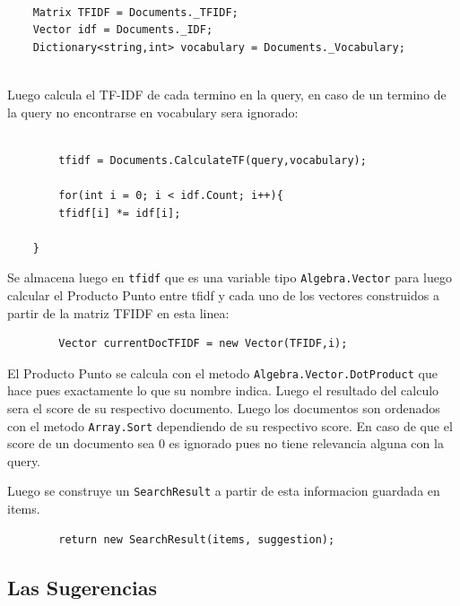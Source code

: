 \documentclass[10pt,a4paper]{report}
\begin{document}
\begin{flushleft}
    \begin{verbatim}
        
    Matrix TFIDF = Documents._TFIDF;
    Vector idf = Documents._IDF;
    Dictionary<string,int> vocabulary = Documents._Vocabulary;
    
    \end{verbatim}

    Luego calcula el TF-IDF de cada termino en la query, en caso de un termino de la query no encontrarse en vocabulary sera ignorado:

    \begin{verbatim}
        
        tfidf = Documents.CalculateTF(query,vocabulary);

        for(int i = 0; i < idf.Count; i++){
        tfidf[i] *= idf[i];
    
    }

    \end{verbatim}

    Se almacena luego en \texttt{tfidf} que es una variable tipo \texttt{Algebra.Vector} para luego calcular el Producto Punto entre tfidf y  cada uno de los vectores construidos a partir de la matriz TFIDF en esta linea:

    \begin{verbatim}
        Vector currentDocTFIDF = new Vector(TFIDF,i);
    \end{verbatim}

    El Producto Punto se calcula con el metodo \texttt{Algebra.Vector.DotProduct} que hace pues exactamente lo que su nombre indica. Luego el resultado del calculo sera el score de su respectivo documento. Luego los documentos son ordenados con el metodo \texttt{Array.Sort} dependiendo de su respectivo score. En caso de que el score de un documento sea 0 es ignorado pues no tiene relevancia alguna con la query.

    Luego se construye un \texttt{SearchResult} a partir de esta informacion guardada en items.
    
    \begin{verbatim}
        return new SearchResult(items, suggestion);
    \end{verbatim}

    \subsection{Las Sugerencias}


\end{flushleft}
\end{document}

